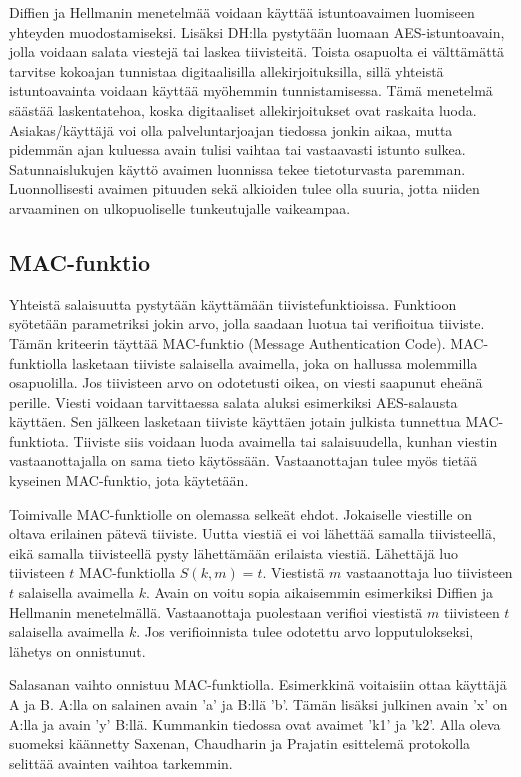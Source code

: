 \documentclass[finnish]{tktltiki2}
\theoremstyle{definition}
\theoremstyle{remark}
\begin{document}
Diffien ja Hellmanin menetelmää voidaan käyttää istuntoavaimen luomiseen yhteyden muodostamiseksi. Lisäksi DH:lla pystytään luomaan AES-istuntoavain, jolla voidaan salata viestejä tai laskea tiivisteitä. Toista osapuolta ei välttämättä tarvitse kokoajan tunnistaa digitaalisilla allekirjoituksilla, sillä yhteistä istuntoavainta voidaan käyttää myöhemmin tunnistamisessa. Tämä menetelmä säästää laskentatehoa, koska digitaaliset allekirjoitukset ovat raskaita luoda. Asiakas/käyttäjä voi olla palveluntarjoajan tiedossa jonkin aikaa, mutta pidemmän ajan kuluessa avain tulisi vaihtaa tai vastaavasti istunto sulkea. Satunnaislukujen käyttö avaimen luonnissa tekee tietoturvasta paremman. Luonnollisesti avaimen pituuden sekä alkioiden tulee olla suuria, jotta niiden arvaaminen on ulkopuoliselle tunkeutujalle vaikeampaa. \cite{enti}

\subsection{MAC-funktio}

Yhteistä salaisuutta pystytään käyttämään tiivistefunktioissa. Funktioon syötetään parametriksi jokin arvo, jolla saadaan luotua tai  verifioitua tiiviste. Tämän kriteerin täyttää MAC-funktio (Message Authentication Code). MAC-funktiolla lasketaan tiiviste salaisella avaimella, joka on hallussa molemmilla osapuolilla. Jos tiivisteen arvo on odotetusti oikea, on viesti saapunut eheänä perille. Viesti voidaan tarvittaessa salata aluksi esimerkiksi AES-salausta käyttäen. Sen jälkeen lasketaan tiiviste käyttäen jotain julkista tunnettua MAC-funktiota. Tiiviste siis voidaan luoda avaimella tai salaisuudella, kunhan viestin vastaanottajalla on sama tieto käytössään. Vastaanottajan tulee myös tietää kyseinen MAC-funktio, jota käytetään.

Toimivalle MAC-funktiolle on olemassa selkeät ehdot. Jokaiselle viestille on oltava erilainen pätevä tiiviste. Uutta viestiä ei voi lähettää samalla tiivisteellä, eikä samalla tiivisteellä pysty lähettämään erilaista viestiä. Lähettäjä luo tiivisteen $t$ MAC-funktiolla $S(k,m) = t$. Viestistä $m$ vastaanottaja luo tiivisteen $t$  salaisella avaimella $k$. Avain on voitu sopia aikaisemmin esimerkiksi Diffien ja Hellmanin menetelmällä. Vastaanottaja puolestaan verifioi viestistä $m$ tiivisteen $t$ salaisella avaimella $k$. Jos verifioinnista tulee odotettu arvo lopputulokseksi, lähetys on onnistunut. \cite{MACA} 
 
Salasanan vaihto onnistuu MAC-funktiolla. Esimerkkinä voitaisiin ottaa käyttäjä A ja B. A:lla on salainen avain 'a' ja B:llä 'b'. Tämän lisäksi julkinen avain 'x' on A:lla ja avain 'y' B:llä. Kummankin tiedossa ovat avaimet 'k1' ja 'k2'. Alla oleva suomeksi käännetty Saxenan, Chaudharin ja Prajatin \cite{MAC} esittelemä protokolla selittää avainten vaihtoa tarkemmin.
\end{document}

